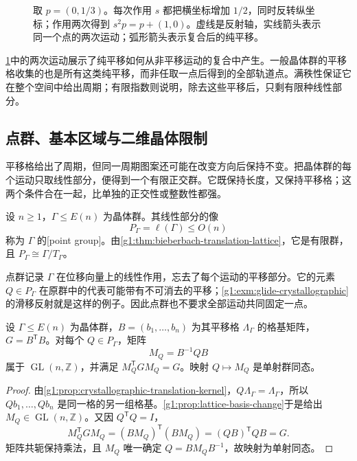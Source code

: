 \begin{figure}[htbp]
	\centering
	
	\caption[滑移反射与整周期平移]{取 \(p=(0,1/3)\)。每次作用 \(s\) 都把横坐标增加 \(1/2\)，同时反转纵坐标；作用两次得到 \(s^2p=p+(1,0)\)。虚线是反射轴，实线箭头表示同一个点的两次运动；弧形箭头表示复合后的纯平移。}
	\label{g1:fig:glide-translation}
\end{figure}

\cref{g1:fig:glide-translation}中的两次运动展示了纯平移如何从非平移运动的复合中产生。一般晶体群的平移格收集的也是所有这类纯平移，而非任取一点后得到的全部轨道点。满秩性保证它在整个空间中给出周期；有限指数则说明，除去这些平移后，只剩有限种线性部分。

\subsection{点群、基本区域与二维晶体限制}
\label{g1:subsec:B04:02}

平移格给出了周期，但同一周期图案还可能在改变方向后保持不变。把晶体群的每个运动只取线性部分，便得到一个有限正交群。它既保持长度，又保持平移格；这两个条件合在一起，比单独的正交性或整数性都强。

\begin{definition}
	\label{g1:def:crystallographic-point-group}
	设 \(n\ge1\)，\(\Gamma\le E(n)\) 为晶体群。其线性部分的像
	\[
		P_\Gamma=\ell(\Gamma)\le O(n)
	\]
	称为 \(\Gamma\) 的[point group]。由\cref{g1:thm:bieberbach-translation-lattice}，它是有限群，且 \(P_\Gamma\cong\Gamma/T_\Gamma\)。
\end{definition}


点群记录 \(\Gamma\) 在位移向量上的线性作用，忘去了每个运动的平移部分。它的元素 \(Q\in P_\Gamma\) 在原群中的代表可能带有不可消去的平移；\cref{g1:exm:glide-crystallographic}的滑移反射就是这样的例子。因此点群也不要求全部运动共同固定一点。

\begin{proposition}
	\label{g1:prop:point-group-integral-metric}
	设 \(\Gamma\le E(n)\) 为晶体群，\(B=(b_1,\ldots,b_n)\) 为其平移格 \(\Lambda_\Gamma\) 的格基矩阵，\(G=B^{\mathsf T}B\)。对每个 \(Q\in P_\Gamma\)，矩阵
	\[
		M_Q=B^{-1}QB
	\]
	属于 \(\operatorname{GL}(n,\mathbb Z)\)，并满足 \(M_Q^{\mathsf T}GM_Q=G\)。映射 \(Q\mapsto M_Q\) 是单射群同态。
\end{proposition}
\begin{proof}
	由\cref{g1:prop:crystallographic-translation-kernel}，\(Q\Lambda_\Gamma=\Lambda_\Gamma\)，所以 \(Qb_1,\ldots,Qb_n\) 是同一格的另一组格基。\cref{g1:prop:lattice-basis-change}于是给出 \(M_Q\in\operatorname{GL}(n,\mathbb Z)\)。又因 \(Q^{\mathsf T}Q=I\)，
	\[
		M_Q^{\mathsf T}GM_Q=(BM_Q)^{\mathsf T}(BM_Q)
		=(QB)^{\mathsf T}QB=G.
	\]
	矩阵共轭保持乘法，且 \(M_Q\) 唯一确定 \(Q=BM_QB^{-1}\)，故映射为单射同态。
\end{proof}

